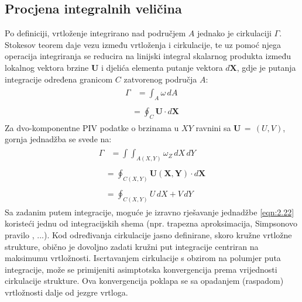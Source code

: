 \subsection{Procjena integralnih veličina}
\begin{description}[style=unboxed,leftmargin=0cm]
	\item[Linijski integral - Cirukulacija] Po definiciji, vrtloženje integrirano nad područjem $A$ jednako je cirkulaciji $\Gamma$. Stokesov teorem daje vezu između vrtloženja i cirkulacije, te uz pomoć njega operacija integriranja se reducira na linijski integral skalarnog produkta između lokalnog vektora brzine $\boldsymbol{U}$ i djelića elementa putanje vektora $d\boldsymbol{X}$, gdje je putanja integracije određena granicom $C$ zatvorenog područja $A$:
	\begin{align}
		\begin{split} \label{eqn:2.18}
			\Gamma&=\int_{A}\omega \, dA
		\end{split} \\
		\begin{split} \label{eqn:2.19}
			&=\oint_{C}\boldsymbol{U}\cdot d\boldsymbol{X}
		\end{split}
	\end{align}
	Za dvo-komponentne PIV podatke o brzinama u $XY$ ravnini sa $\boldsymbol{U}\, =\, (U,V)$, gornja jednadžba se svede na:
	\begin{align}
		\begin{split} \label{eqn:2.20}
			\Gamma&=\int \int_{A(X,Y)}\omega_{Z}\, dX \, dY
		\end{split} \\
		\begin{split} \label{eqn:2.21}
			&=\oint_{C(X,Y)}\boldsymbol{U}(\boldsymbol{X}, \boldsymbol{Y})\cdot d\boldsymbol{X}
		\end{split} \\
		\begin{split} \label{eqn:2.22}
			&=\oint_{C(X,Y)}U \, dX+V \, dY
		\end{split}
	\end{align}
	Sa zadanim putem integracije, moguće je izravno rješavanje jednadžbe \ref{eqn:2.22} koristeći jednu od integracijskih shema (npr. trapezna aproksimacija, Simpsonovo pravilo , ...). Kod određivanja cirkulacije jasno definirane, skoro kružne vrtložne strukture, obično je dovoljno zadati kružni put integracije centriran na maksimumu vrtložnosti. Iscrtavanjem cirkulacije s obzirom na polumjer puta integracije, može se primijeniti asimptotska konvergencija prema vrijednosti cirkulacije strukture. Ova konvergencija poklapa se sa opadanjem (raspadom) vrtložnosti dalje od jezgre vrtloga. 

\end{description}
